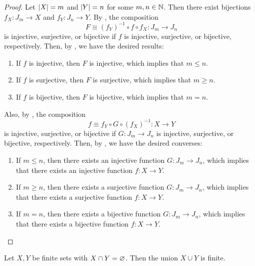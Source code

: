 \begin{proof}
    Let $\abs*{X} = m$ and $\abs*{Y} = n$ for some $m, n \in \N$. Then there exist bijections
    $f_{X}: J_{m} \to X$ and $f_{Y}: J_{n} \to Y$.
    By , the composition
    \[
    F \equiv (f_{Y})^{-1} \circ f \circ f_{X}: J_{m} \to J_{n}
    \]
    is injective, surjective, or bijective if $f$ is injective, surjective, or bijective, respectively.
    Then, by , we have the desired results:
    \begin{enumerate}[label=\textbf{(\Alph*)}]
        \item If $f$ is injective, then $F$ is injective, which implies that $m \leq n$.
        \item If $f$ is surjective, then $F$ is surjective, which implies that $m \geq n$.
        \item If $f$ is bijective, then $F$ is bijective, which implies that $m = n$.
    \end{enumerate}
    Also, by , the composition
    \[
    f \equiv f_{Y} \circ G \circ (f_{X})^{-1}: X \to Y
    \]
    is injective, surjective, or bijective if $G: J_{m} \to J_{n}$ is injective, surjective, or bijective, respectively.
    Then, by , we have the desired converses:
    \begin{enumerate}[label=\textbf{(\Alph*)}]
        \item If $m \leq n$, then there exists an injective function $G: J_{m} \to J_{n}$,
        which implies that there exists an injective function $f: X \to Y$.
        \item If $m \geq n$, then there exists a surjective function $G: J_{m} \to J_{n}$,
        which implies that there exists a surjective function $f: X \to Y$.
        \item If $m = n$, then there exists a bijective function $G: J_{m} \to J_{n}$,
        which implies that there exists a bijective function $f: X \to Y$.
    \end{enumerate}
\end{proof}

\bigskip

\begin{lemma} \label{lem:UnionOfTwoDisjointFiniteSetsIsFinite}
    Let $X, Y$ be finite sets with $X \cap Y = \vnot$. Then the union $X \cup Y$ is finite.
\end{lemma}

